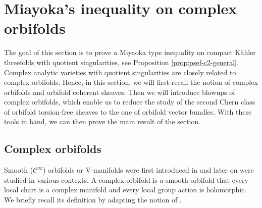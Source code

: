\documentclass[12pt]{amsart}
\newcommand{\<}{\leq}
\theoremstyle{remark}
\theoremstyle{definition}
\theoremstyle{definition}
\numberwithin{equation}{section}
\theoremstyle{definition}
\theoremstyle{definition}
\begin{document}
 
 



\section{Miayoka's inequality on complex orbifolds} 
\label{section:chern}

The goal of this section is to prove a Miyaoka type inequality on compact  K\"ahler threefolds with quotient singularities, see Proposition \ref{prop:psef-c2-general}.    
Complex analytic varieties with quotient singularities are closely related to complex orbifolds. 
Hence, in this section, we will first recall the notion of complex orbifolds and orbifold coherent sheaves.  
Then we will introduce  blowups of  complex orbifolds, which enable us to reduce the study of the second Chern class  of orbifold torsion-free sheaves to the one of orbifold vector bundles.  
With these tools in hand, we can  then prove the main result  of the section. 


\subsection{Complex orbifolds}   
 
Smooth ($\mathcal{C}^{\infty}$)  orbifolds or V-manifolds  were first introduced in \cite{Satake1956} and later on were studied in various contexts.
A complex orbifold is a smooth orbifold that every local chart is a complex manifold and every local group action is holomorphic. 
We briefly recall its definition by adapting the notion of  \cite[Section 4]{ChenRuan2002}.
\end{document}
